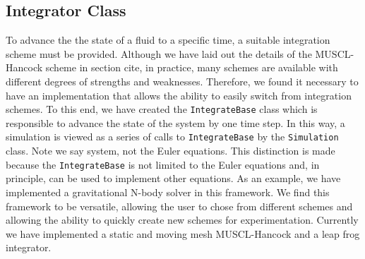 \subsection{Integrator Class}
\label{sec.integrator}
To advance the the state of a fluid to a specific time, a suitable integration
scheme must be provided. Although we have laid out the details of the MUSCL-Hancock scheme
in section cite, in practice, many schemes are available with different degrees of 
strengths and weaknesses. Therefore, we found it necessary to have an implementation
that allows the ability to easily switch from integration schemes. To this end, we have
created the \lstinline{IntegrateBase} class which is responsible to advance the state
of the system by one time step. In this way, a simulation is viewed as a series of calls
to \lstinline{IntegrateBase} by the \lstinline{Simulation} class.
Note we say system, not the Euler equations. This
distinction is made because the \lstinline{IntegrateBase} is not limited to the Euler
equations and, in principle, can be used to implement other equations. As an example,
we have implemented a gravitational N-body solver in this framework. We find
this framework to be versatile, allowing the user to chose from different schemes
and allowing the ability to quickly create new schemes for experimentation.
Currently we have implemented a static and moving mesh MUSCL-Hancock and a leap
frog integrator.

